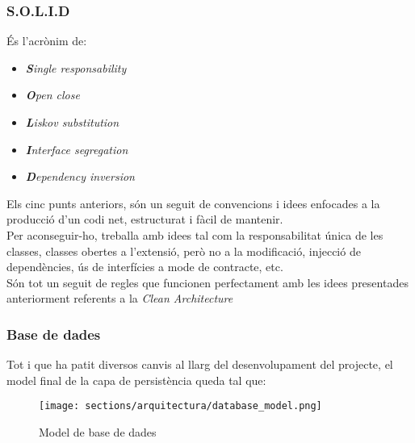 \subsubsection{S.O.L.I.D}
\label{arquitectura:back_solid}
\cite{solid} És l'acrònim de:
\begin{itemize}
    \item \textit{\textbf{S}ingle responsability}
    \item \textit{\textbf{O}pen close}
    \item \textit{\textbf{L}iskov substitution}
    \item \textit{\textbf{I}nterface segregation}
    \item \textit{\textbf{D}ependency inversion}
\end{itemize}
Els cinc punts anteriors, són un seguit de convencions i idees enfocades a la producció d'un codi net, estructurat i fàcil de mantenir.\\
\newline Per aconseguir-ho, treballa amb idees tal com la responsabilitat única de les classes, classes obertes a l'extensió, però no a la modificació, injecció de dependències, ús de interfícies a mode de contracte, etc.\\
\newline Són tot un seguit de regles que funcionen perfectament amb les idees presentades anteriorment referents a la \textit{Clean Architecture}
\subsubsection{Base de dades}
Tot i que ha patit diversos canvis al llarg del desenvolupament del projecte, el model final de la capa de persistència queda tal que:
\begin{figure}[h]
\texttt{[image: sections/arquitectura/database\_model.png]}
\centering
\caption{Model de base de dades}
\label{fig:database_model}
\end{figure}



